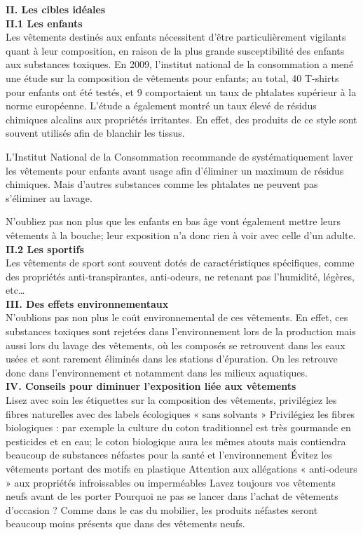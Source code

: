 \documentclass[8pt]{article}
\begin{document}
\textbf{II. Les cibles idéales}\\

\textbf{II.1 Les enfants}\\

Les vêtements destinés aux enfants nécessitent d’être particulièrement vigilants quant à leur composition, en raison de la plus grande susceptibilité des enfants aux substances toxiques. En 2009, l’institut national de la consommation a mené une étude sur la composition de vêtements pour enfants; au total, 40 T-shirts pour enfants ont été testés, et 9 comportaient un taux de phtalates supérieur à la norme européenne. L’étude a également montré un taux élevé de résidus chimiques alcalins aux propriétés irritantes. En effet, des produits de ce style sont souvent utilisés afin de blanchir les tissus.

L’Institut National de la Consommation recommande de systématiquement laver les vêtements pour enfants avant usage afin d’éliminer un maximum de résidus chimiques. Mais d’autres substances comme les phtalates ne peuvent pas s’éliminer au lavage.

N’oubliez pas non plus que les enfants en bas âge vont également mettre leurs vêtements à la bouche; leur exposition n’a donc rien à voir avec celle d’un adulte.\\

\textbf{II.2 Les sportifs}\\


Les vêtements de sport sont souvent dotés de caractéristiques spécifiques, comme des propriétés anti-transpirantes, anti-odeurs, ne retenant pas l’humidité, légères, etc…\\

\textbf{III. Des effets environnementaux}\\


N’oublions pas non plus le coût environnemental de ces vêtements. En effet, ces substances toxiques sont rejetées dans l’environnement lors de la production mais aussi lors du lavage des vêtements, où les composés se retrouvent dans les eaux usées et sont rarement éliminés dans les stations d’épuration. On les retrouve donc dans l’environnement et notamment dans les milieux aquatiques.\\


\textbf{IV. Conseils pour diminuer l’exposition liée aux vêtements}\\


Lisez avec soin les étiquettes sur la composition des vêtements, privilégiez les fibres naturelles avec des labels écologiques « sans solvants »
Privilégiez les fibres biologiques : par exemple la culture du coton traditionnel est très gourmande en pesticides et en eau; le coton biologique aura les mêmes atouts mais contiendra beaucoup de substances néfastes pour la santé et l’environnement
Évitez les vêtements portant des motifs en plastique
Attention aux allégations « anti-odeurs » aux propriétés infroissables ou imperméables
Lavez toujours vos vêtements neufs avant de les porter
Pourquoi ne pas se lancer dans l’achat de vêtements d’occasion ? Comme dans le cas du mobilier, les produits néfastes seront beaucoup moins présents que dans des vêtements neufs.\\
\end{document}
